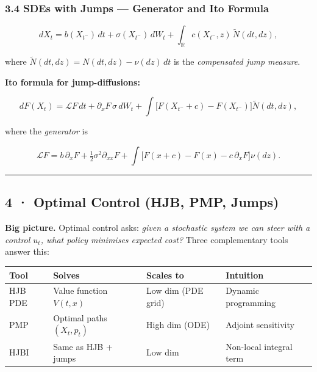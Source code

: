 \documentclass[11pt,a4paper]{article}
\begin{document}
\subsubsection{3.4 SDEs with Jumps --- Generator and Ito Formula}\label{sdes-with-jumps-generator-and-ito-formula}

\[dX_t = b(X_{t^-})\,dt + \sigma(X_{t^-})\,dW_t
+ \int_{\mathbb{R}} c(X_{t^-}, z)\,\tilde N(dt, dz),\]

where \(\tilde N(dt,dz) = N(dt,dz) - \nu(dz)\,dt\) is the \emph{compensated jump measure}.

\textbf{Ito formula for jump-diffusions:}

\[dF(X_t) = \mathcal{L}F\,dt + \partial_x F\,\sigma\,dW_t
+ \int\bigl[F(X_{t^-}+c)-F(X_{t^-})\bigr]\tilde N(dt,dz),\]

where the \emph{generator} is

\[\mathcal{L}F = b\,\partial_x F + \tfrac12\sigma^2\partial_{xx}F
+ \int\bigl[F(x+c)-F(x)-c\,\partial_x F\bigr]\nu(dz).\]

\begin{center}\rule{0.5\linewidth}{0.5pt}\end{center}

\subsection{4 · Optimal Control (HJB, PMP, Jumps)}\label{optimal-control-hjb-pmp-jumps}

\textbf{Big picture.} Optimal control asks: \emph{given a stochastic system we can steer with a control \(u_t\), what policy minimises expected cost?} Three complementary tools answer this:

{\def\LTcaptype{none} %
\begin{longtable}[]{@{}
  >{\raggedright\arraybackslash}p{}
  >{\raggedright\arraybackslash}p{}
  >{\raggedright\arraybackslash}p{}
  >{\raggedright\arraybackslash}p{}@{}}
\toprule\noalign{}
\begin{minipage}[b]{\linewidth}\raggedright
Tool
\end{minipage} & \begin{minipage}[b]{\linewidth}\raggedright
Solves
\end{minipage} & \begin{minipage}[b]{\linewidth}\raggedright
Scales to
\end{minipage} & \begin{minipage}[b]{\linewidth}\raggedright
Intuition
\end{minipage} \\
\midrule\noalign{}
\endhead
\bottomrule\noalign{}
\endlastfoot
HJB PDE & Value function \(V(t,x)\) & Low dim (PDE grid) & Dynamic programming \\
PMP & Optimal paths \((X_t,p_t)\) & High dim (ODE) & Adjoint sensitivity \\
HJBI & Same as HJB + jumps & Low dim & Non-local integral term \\
\end{longtable}
}
\end{document}
